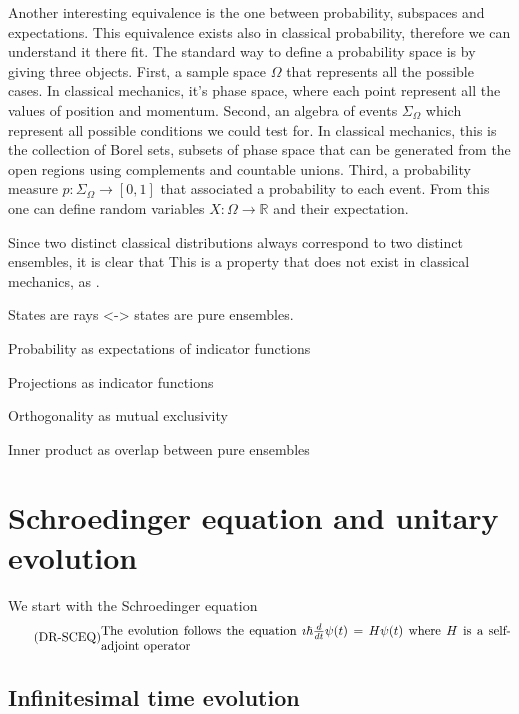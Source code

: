 Another interesting equivalence is the one between probability, subspaces and expectations. This equivalence exists also in classical probability, therefore we can understand it there fit. The standard way to define a probability space is by giving three objects. First, a sample space $\Omega$ that represents all the possible cases. In classical mechanics, it's phase space, where each point represent all the values of position and momentum. Second, an algebra of events $\Sigma_{\Omega}$ which represent all possible conditions we could test for. In classical mechanics, this is the collection of Borel sets, subsets of phase space that can be generated from the open regions using complements and countable unions. Third, a probability measure $p : \Sigma_{\Omega} \to [0,1]$ that associated a probability to each event. From this one can define random variables $X : \Omega \to \mathbb{R}$ and their expectation.




Since two distinct classical distributions always correspond to two distinct ensembles, it is clear that  This is a property that does not exist in classical mechanics, as .

States are rays <-> states are pure ensembles.

Probability as expectations of indicator functions

Projections as indicator functions

Orthogonality as mutual exclusivity

Inner product as overlap between pure ensembles

\section{Schroedinger equation and unitary evolution}

We start with the Schroedinger equation
\begin{equation}\label{rp-qm-uev-condSchroedingerEq}
	\tag{DR-SCEQ}
	\eqtext{The evolution follows the equation $\imath \hbar \frac{d}{dt} \psi(t) = H \psi(t)$ where $H$ is a self-adjoint operator}
\end{equation}

\subsection{Infinitesimal time evolution}

